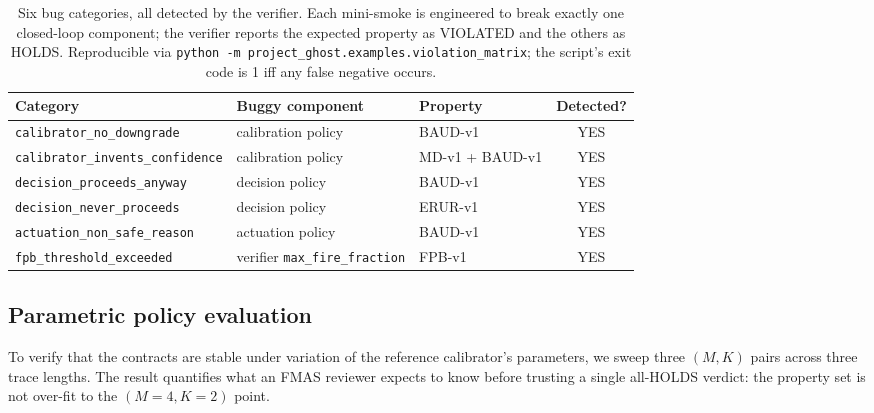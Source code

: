 \documentclass[11pt,a4paper]{article}
\begin{document}
\begin{table}[h]
\centering\small
\begin{tabular}{lll c}
\toprule
\textbf{Category} & \textbf{Buggy component} & \textbf{Property} & \textbf{Detected?} \\
\midrule
\texttt{calibrator\_no\_downgrade}        & calibration policy           & BAUD-v1               & YES \\
\texttt{calibrator\_invents\_confidence}  & calibration policy           & MD-v1 + BAUD-v1       & YES \\
\texttt{decision\_proceeds\_anyway}       & decision policy              & BAUD-v1               & YES \\
\texttt{decision\_never\_proceeds}        & decision policy              & ERUR-v1               & YES \\
\texttt{actuation\_non\_safe\_reason}     & actuation policy             & BAUD-v1               & YES \\
\texttt{fpb\_threshold\_exceeded}         & verifier \texttt{max\_fire\_fraction} & FPB-v1     & YES \\
\bottomrule
\end{tabular}
\caption{Six bug categories, all detected by the verifier. Each
mini-smoke is engineered to break exactly one closed-loop
component; the verifier reports the expected property as VIOLATED
and the others as HOLDS. Reproducible via
\texttt{python -m project\_ghost.examples.violation\_matrix};
the script's exit code is 1 iff any false negative occurs.}
\label{tab:violation}
\end{table}

\subsection{Parametric policy evaluation}

To verify that the contracts are stable under variation of the
reference calibrator's parameters, we sweep three $(M,K)$ pairs
across three trace lengths. The result quantifies what an FMAS
reviewer expects to know before trusting a single all-HOLDS
verdict: the property set is not over-fit to the
$(M{=}4,K{=}2)$ point.
\end{document}
